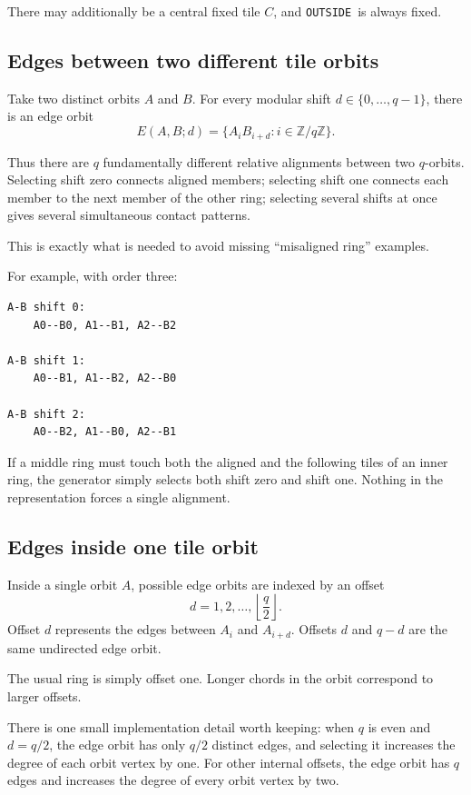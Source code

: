 \documentclass[11pt]{article}
\newcommand{\OUT}{\texttt{OUTSIDE}}
\begin{document}
There may additionally be a central fixed tile \(C\), and \OUT\ is always fixed.

\subsection{Edges between two different tile orbits}

Take two distinct orbits \(A\) and \(B\). For every modular shift \(d\in\{0,\ldots,q-1\}\), there is an edge orbit
\[
E(A,B;d)=\bigl\{A_i B_{i+d}: i\in\mathbb Z/q\mathbb Z\bigr\}.
\]

Thus there are \(q\) fundamentally different relative alignments between two \(q\)-orbits. Selecting shift zero connects aligned members; selecting shift one connects each member to the next member of the other ring; selecting several shifts at once gives several simultaneous contact patterns.

This is exactly what is needed to avoid missing ``misaligned ring'' examples.

For example, with order three:
\begin{lstlisting}
A-B shift 0:
    A0--B0, A1--B1, A2--B2

A-B shift 1:
    A0--B1, A1--B2, A2--B0

A-B shift 2:
    A0--B2, A1--B0, A2--B1
\end{lstlisting}

If a middle ring must touch both the aligned and the following tiles of an inner ring, the generator simply selects both shift zero and shift one. Nothing in the representation forces a single alignment.

\subsection{Edges inside one tile orbit}

Inside a single orbit \(A\), possible edge orbits are indexed by an offset
\[
d=1,2,\ldots,\left\lfloor\frac q2\right\rfloor.
\]
Offset \(d\) represents the edges between \(A_i\) and \(A_{i+d}\). Offsets \(d\) and \(q-d\) are the same undirected edge orbit.

The usual ring is simply offset one. Longer chords in the orbit correspond to larger offsets.

There is one small implementation detail worth keeping: when \(q\) is even and \(d=q/2\), the edge orbit has only \(q/2\) distinct edges, and selecting it increases the degree of each orbit vertex by one. For other internal offsets, the edge orbit has \(q\) edges and increases the degree of every orbit vertex by two.
\end{document}
